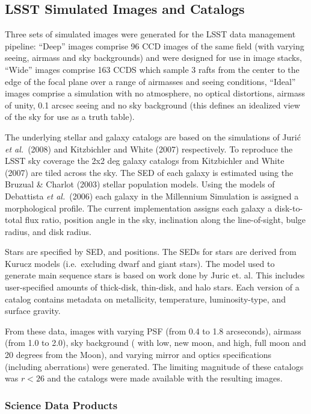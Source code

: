 \subsection{LSST Simulated Images and Catalogs}

Three sets of simulated images were generated for the LSST data
management pipeline: ``Deep'' images comprise 96 CCD images of the
same field (with varying seeing, airmass and sky backgrounds) and were
designed for use in image stacks, ``Wide'' images comprise 163 CCDS
which sample 3 rafts from the center to the edge of the focal plane
over a range of airmasses and seeing conditions, ``Ideal'' images
comprise a simulation with no atmosphere, no optical distortions,
airmass of unity, 0.1 arcsec seeing and no sky background (this
defines an idealized view of the sky for use as a truth table).

The underlying stellar and galaxy catalogs are based on the
simulations of Juri\'c {\it et al.}~(2008) and Kitzbichler and White
(2007) respectively.  To reproduce the LSST sky coverage the 2x2 deg
galaxy catalogs from Kitzbichler and White (2007) are tiled across the
sky.  The SED of each galaxy is estimated using the Bruzual \& Charlot
(2003) stellar population models. Using the models of Debattista
\textit{et al.}~(2006) each galaxy in the Millennium Simulation is
assigned a morphological profile. The current implementation assigns
each galaxy a disk-to-total flux ratio, position angle in the sky,
inclination along the line-of-sight, bulge radius, and disk radius.

Stars are specified by SED, and positions. The SEDs for stars are
derived from Kurucz models (i.e.\ excluding dwarf and giant
stars). The model used to generate main sequence stars is based on
work done by Juric et. al. This includes user-specified amounts of
thick-disk, thin-disk, and halo stars. Each version of a catalog
contains metadata on metallicity, temperature, luminosity-type, and
surface gravity.

From these data, images with varying PSF (from 0.4 to 1.8 arcseconds),
airmass (from 1.0 to 2.0), sky background ( with low, new moon, and
high, full moon and 20 degrees from the Moon), and varying mirror and
optics specifications (including aberrations) were generated.  The
limiting magnitude of these catalogs was $r<26$ and the catalogs were
made available with the resulting images.

\subsubsection{Science Data Products}

